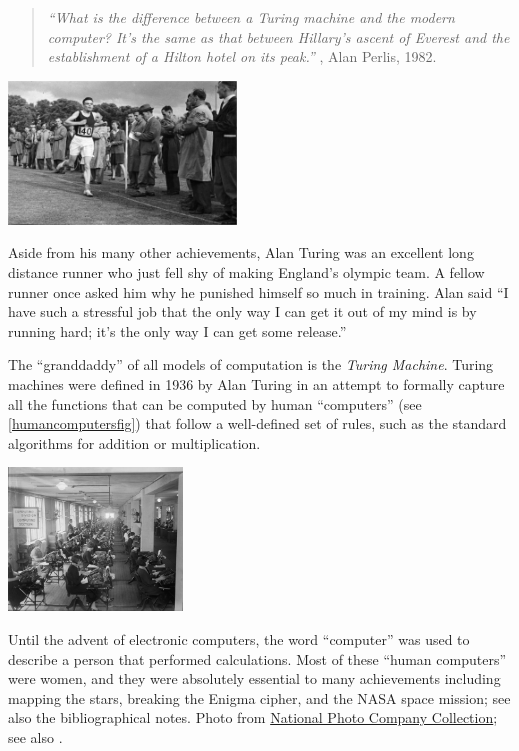 \begin{quote}
\emph{``What is the difference between a Turing machine and the modern
computer? It's the same as that between Hillary's ascent of Everest and
the establishment of a Hilton hotel on its peak.''} , Alan Perlis, 1982.
\end{quote}


\begin{marginfigure}
\centering
\includegraphics[width=\linewidth, height=1.5in, keepaspectratio]{../figure/alan-turing-running.jpg}
\caption{Aside from his many other achievements, Alan Turing was an
excellent long distance runner who just fell shy of making England's
olympic team. A fellow runner once asked him why he punished himself so
much in training. Alan said ``I have such a stressful job that the only
way I can get it out of my mind is by running hard; it's the only way I
can get some release.''}
\label{turingrunning}
\end{marginfigure}

The ``granddaddy'' of all models of computation is the \emph{Turing
Machine}. Turing machines were defined in 1936 by Alan Turing in an
attempt to formally capture all the functions that can be computed by
human ``computers'' (see \cref{humancomputersfig}) that follow a
well-defined set of rules, such as the standard algorithms for addition
or multiplication.


\begin{marginfigure}
\centering
\includegraphics[width=\linewidth, height=1.5in, keepaspectratio]{../figure/HumanComputers.jpg}
\caption{Until the advent of electronic computers, the word ``computer''
was used to describe a person that performed calculations. Most of these
``human computers'' were women, and they were absolutely essential to
many achievements including mapping the stars, breaking the Enigma
cipher, and the NASA space mission; see also the bibliographical notes.
Photo from \href{https://www.loc.gov/pictures/item/2016838906/}{National
Photo Company Collection}; see also \cite{sobel2017the}.}
\label{humancomputersfig}
\end{marginfigure}

